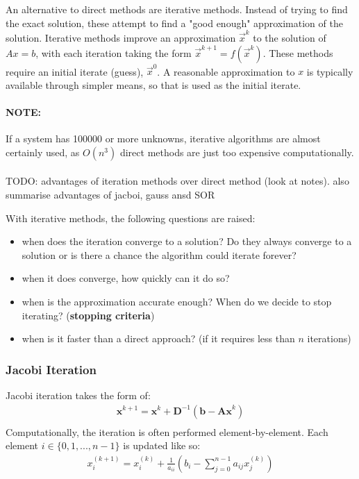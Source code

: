 \documentclass{article}
\begin{document}
An alternative to direct methods are iterative methods. Instead of trying to find the exact solution, these attempt to find a "good enough" approximation of the solution. Iterative methods improve an approximation $\vec{x}^{k}$ to the solution of $Ax = b$, with each iteration taking the form $\vec{x}^{k + 1} = f(\vec{x}^{k})$. These methods require an initial iterate (guess), $\vec{x}^{0}$. A reasonable approximation to $x$ is typically available through simpler means, so that is used as the initial iterate.

\paragraph{\textbf{NOTE:}} If a system has 100000 or more unknowns, iterative algorithms are almost certainly used, as $O(n^3)$ direct methods are just too expensive computationally.

\paragraph{}

TODO: advantages of iteration methods over direct method (look at notes). also summarise advantages of jacboi, gauss ansd SOR

With iterative methods, the following questions are raised:
\begin{itemize}
	\item when does the iteration converge to a solution? Do they always converge to a solution or is there a chance the algorithm could iterate forever?
	\item when it does converge, how quickly can it do so?
	\item when is the approximation accurate enough? When do we decide to stop iterating? (\textbf{stopping criteria})
	\item when is it faster than a direct approach? (if it requires less than $n$ iterations)
\end{itemize}

\subsubsection{Jacobi Iteration}

Jacobi iteration takes the form of:
\begin{multline}
	\mathbf{x}^{k+1} = \mathbf{x}^{k} + \mathbf{D}^{-1}(\mathbf{b} - \mathbf{Ax}^{k})\\
	\label{eq:jacobi}
\end{multline}
Computationally, the iteration is often performed element-by-element. Each element $i \in \lbrace 0, 1, ..., n - 1 \rbrace$ is updated like so:
\begin{multline}
	x_i^{(k+1)} = x_i^{(k)} + \frac{1}{a_{ii}}(b_i - \sum_{j=0}^{n - 1} {a_{ij}x_{j}^{(k)}})
	\\
	\label{eq:jacobi-elembyelem}
\end{multline}
\end{document}
